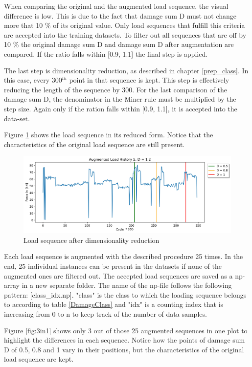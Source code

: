 When comparing the original and the augmented load sequence, the visual difference is low. This is due to the fact that damage sum D must not change more that 10 \% of its original value. Only load sequences that fulfill this criteria are accepted into the training datasets.
To filter out all sequences that are off by 10 \% the original damage sum D and damage sum D after augmentation are compared.
If the ratio falls within [0.9, 1.1] the final step is applied.


The last step is dimensionality reduction, as described in chapter \ref{prep_class}. In this case, every 300\(^{th}\) point in that sequence is kept. This step is effectively reducing the length of the sequence by 300. For the last comparison of the damage sum D, the denominator in the Miner rule must be multiplied by the step size. Again only if the ration falls within [0.9, 1.1], it is accepted into the data-set. 

Figure \ref{fig:Verlauf_5_reduced} shows the load sequence in its reduced form. Notice that the characteristics of the original load sequence are still present.
 
\begin{figure}[H]
	\centering
	\includegraphics[width=1\linewidth]{IMGs/Verlauf_5_reduced.png}
	\caption{Load sequence after dimensionality reduction}
	\label{fig:Verlauf_5_reduced}
\end{figure}

Each load sequence is augmented with the described procedure 25 times. In the end, 25 individual instances can be present in the datasets if none of the augmented ones are filtered out. 
The accepted load sequences are saved as a np-array in a new separate folder. The name of the np-file follows the following pattern: [class\_idx.np]. "class" is the class to which the loading sequence belongs to according to table \ref{DamageClass} and "idx" is a counting index that is increasing from 0 to n to keep track of the number of data samples.

Figure \ref{fig:3in1} shows only 3 out of those 25 augmented sequences in one plot to highlight the differences in each sequence.
Notice how the points of damage sum D of 0.5, 0.8 and 1 vary in their positions, but the characteristics of the original load sequence are kept.

